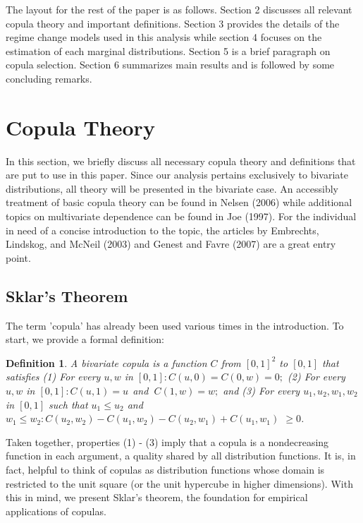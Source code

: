 \documentclass[12pt]{article}
\newtheorem{defn}{Definition}
\begin{document}
The layout for the rest of the paper is as follows. Section 2 discusses all relevant copula theory and important definitions. Section 3 provides the details of the regime change models used in this analysis while section 4 focuses on the estimation of each marginal distributions. Section 5 is a brief paragraph on copula selection. Section 6 summarizes main results and is followed by some concluding remarks.

\section{Copula Theory}

In this section, we briefly discuss all necessary copula theory and definitions that are put to use in this paper. Since our analysis pertains exclusively to bivariate distributions, all theory will be presented in the bivariate case. An accessibly treatment of basic copula theory can be found in Nelsen (2006) while additional topics on multivariate dependence can be found in Joe (1997). For the individual in need of a concise introduction to the topic, the articles by Embrechts, Lindskog, and McNeil (2003) and Genest and Favre (2007) are a great entry point.

\subsection{Sklar's Theorem}

The term 'copula' has already been used various times in the introduction. To start, we provide a formal definition:

\begin{defn}\label{defn:copula}
A bivariate copula is a function $C$ from $\left[0,1\right]^{2}$ to $\left[0,1\right]$ that satisfies (1) For every $u,w$ in $\left[0,1\right] :C\left(u,0\right) = C\left(0,w\right) = 0;$ (2) For every $u,w$ in $\left[0,1\right] :C\left(u,1\right) = u\ \ $and $\ C\left(1,w\right) = w;$ and (3) For every $u_{1}, u_{2}, w_{1}, w_{2}$ in $\left[0,1\right]$ such that $u_{1} \leq u_{2}$ and $w_{1} \leq w_{2}:C\left(u_{2}, w_{2}\right) - C\left(u_{1}, w_{2}\right) - C\left(u_{2}, w_{1}\right) + C\left(u_{1}, w_{1}\right)$ $\geq 0$.
\end{defn}

Taken together, properties (1) - (3) imply that a copula is a nondecreasing function in each argument, a quality shared by all distribution functions. It is, in fact, helpful to think of copulas as distribution functions whose domain is restricted to the unit square (or the unit hypercube in higher dimensions). With this in mind, we present Sklar's theorem, the foundation for empirical applications of copulas.
\end{document}

